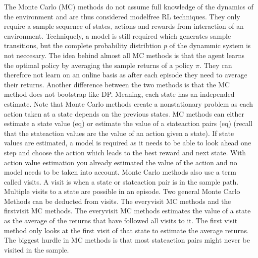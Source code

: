 \documentclass[letterpaper,10pt,english]{jupyterBook}
\begin{document}
\sphinxAtStartPar
The Monte Carlo (MC) methods do not assume full knowledge of the dynamics of the environment and are thus considered model\sphinxhyphen{}free RL techniques. They only require a sample sequence of states, actions and rewards from interaction of an environment. Techniquely, a model is still required which generates sample transitions, but the complete probability distribtion \(p\) of the dynammic system is not neccesary. The idea behind almost all MC methods is that the agent learns the optimal policy by averaging the sample returns of a policy \(\pi\). They can therefore not learn on an online basis as after each episode they need to average their returns. Another difference between the two methods is that the MC method does not bootstrap like DP. Meaning, each state has an independed estimate. Note that Monte Carlo methods create a nonstationary problem as each action taken at a state depends on the previous states. MC methods can either estimate  a state value (eq) or  estimate the value of a state\sphinxhyphen{}action pairs (eq) (recall that the state\sphinxhyphen{}action values are the value of an action given a state). If state values are estimated, a model is required as it needs to be able to look ahead one step and choose the action which leads to the best reward and next state. With action value estimation you already estimated the value of the action and no model needs to be taken into account.  Monte Carlo methods also use a term called visits. A visit is when a state or state\sphinxhyphen{}action pair is in the sample path. Multiple visits to a state are possible in an episode. Two general Monte Carlo Methods can be deducted from visits. The every\sphinxhyphen{}visit MC methods and the first\sphinxhyphen{}visit MC methods. The every\sphinxhyphen{}visit MC methods estimates the value of a state as the average of the returns that have followed all visits to it. The first visit method only looks at the first visit of that state to estimate the average returns. The biggest hurdle in MC methods is that most state\sphinxhyphen{}action pairs might never be visited in the sample.
\end{document}

